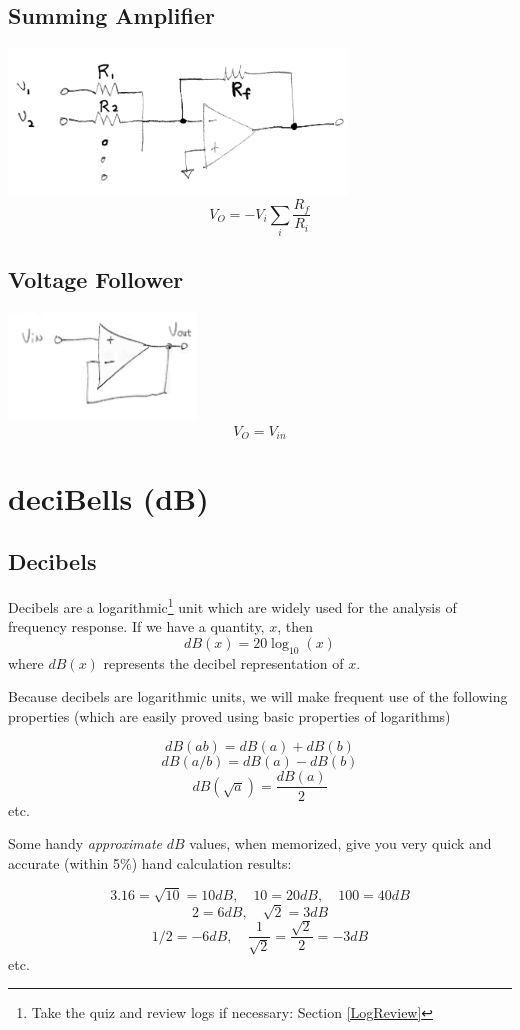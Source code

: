 \subsection{Summing Amplifier}
\includegraphics[width=90mm]{figsChapt01/GC91051.png}
\[
V_O= -V_i\sum_i \frac {R_f}  {R_i}
\]
\subsection{Voltage Follower}
\includegraphics[width=50mm]{figsChapt01/BI19090.png}
\[
V_O = V_{in}
\]
\section{deciBells (dB)}


\subsection{Decibels}

Decibels are a logarithmic\footnote{Take the quiz and review logs if necessary: Section \ref{LogReview}} unit which are widely used for the analysis of frequency response.   If we have a quantity, $x$, then
\[
dB(x) = 20\log_{10}(x)
\]
where $dB(x)$ represents the decibel representation of $x$.


Because decibels are logarithmic units, we will make frequent use of the following properties (which are easily proved using basic properties of logarithms)

\[
dB(ab) = dB(a)+ dB(b)
\]
\[
dB(a/b) = dB(a) - dB(b)
\]
\[
dB(\sqrt{a}) = \frac {dB(a)}{2}
\]
etc.

Some handy {\it approximate} $dB$ values, when  memorized, give you very quick and accurate (within 5\%) hand calculation results:

\[
3.16 = \sqrt{10} = 10dB ,\quad 10 = 20dB, \quad 100 = 40dB
\]
\[
2 = 6dB, \quad   \sqrt{2} = 3dB
\]
\[
1/2 = -6dB, \quad \frac{1}{\sqrt{2}} = \frac{\sqrt{2}}{2} = -3dB
\]
etc.


